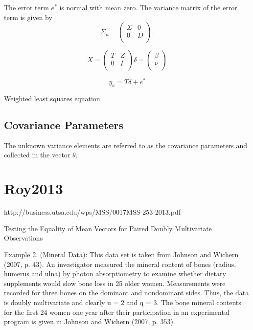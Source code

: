 \documentclass[12pt, a4paper]{report}
\theoremstyle{plain}
\theoremstyle{definition}
\theoremstyle{remark}
\begin{document}


The error term $e^{*}$ is normal with mean zero. The variance matrix of the error term is given by
\begin{equation}
\Sigma_{a} = \left(%
\begin{array}{cc}
\Sigma & 0 \\
0 & D \\
\end{array}%
\right).
\end{equation}

\begin{equation}
X = \left(%
\begin{array}{cc}
T & Z \\
0 & I \\
\end{array}%
\right)
\delta = \left(%
\begin{array}{c}
\beta  \\
\nu  \\
\end{array}%
\right)
\end{equation}



\begin{equation}
y_{a} = T \delta + e^{*}
\end{equation}

Weighted least squares equation



\newpage
\section{Covariance Parameters} %
The unknown variance elements are referred to as the covariance parameters and collected in the vector $\theta$.




\chapter{Roy2013}

http://business.utsa.edu/wps/MSS/0017MSS-253-2013.pdf


Testing the Equality of Mean Vectors for Paired Doubly Multivariate Observations 


Example 2. (Mineral Data): This data set is taken from Johnson and Wichern (2007, p. 43).
An investigator measured the mineral content of bones (radius, humerus and ulna) by photon
absorptiometry to examine whether dietary supplements would slow bone loss in 25 older women.
Measurements were recorded for three bones on the dominant and nondominant sides. Thus,
the data is doubly multivariate and clearly u = 2 and q = 3.
The bone mineral contents for the ﬁrst 24 women one year after their participation in an
experimental program is given in Johnson and Wichern (2007, p. 353). 
\end{document}
